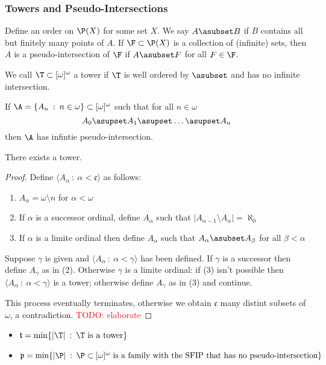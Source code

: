 \documentclass{article}
\begin{document}
\subsubsection{Towers and Pseudo-Intersections}
\begin{defn}
    Define an order on \(\P(X)\) for some set \(X\). We say \(A \asubset B\) if \(B\) contains all but finitely many points of \(A\). If \(\F \subset \P(X)\) is a collection of (infinite) sets, then \(A\) is a pseudo-intersection of \(\F\) if \(A \asubset F\) for all \(F \in \F\).
\end{defn}
\begin{defn}
    We call \(\T \subset [\omega]^{\omega}\) a tower if \(\T\) is well ordered by \(\asubset\) and has no infinite intersection.
\end{defn}
\begin{lem}
    If \(\A = \{A_n \: : \: n \in \omega\} \subset [\omega]^{\omega}\) such that for all \(n \in \omega\)
    \[
        A_0 \asupset  A_1 \asupset \dots \asupset  A_n
    \]
    then \(\A\) has infintie pseudo-intersection.
\end{lem}
\begin{thm}
    There exists a tower.
\end{thm}
\begin{proof}
    Define \(\langle A_{\alpha} \: : \: \alpha < \mathfrak{c}\rangle\) as follows: 
    \begin{enumerate}
        \item \(A_{\alpha} = \omega \setminus n\) for \(\alpha < \omega\)
        \item If \(\alpha\) is a successor ordinal, define \(A_{\alpha}\) such that \(|A_{\alpha - 1}\setminus A_{\alpha}| =\aleph_0\)
        \item If \(\alpha\) is a limite ordinal then define \(A_{\alpha}\) such that \(A_{\alpha} \asubset A_{\beta}\) for all \(\beta < \alpha\)
    \end{enumerate}
    Suppose \(\gamma\) is given and \(\langle A_{\alpha} \: : \: \alpha < \gamma \rangle\) has been defined. If \(\gamma\) is a successor then define \(A_{\gamma}\) as in (2). Otherwise \(\gamma\) is a limite ordinal: if (3) isn't possible then \(\langle A_{\alpha} \: : \: \alpha < \gamma \rangle\) is a tower; otherwise define \(A_{\gamma}\) as in (3) and continue. 

    This process eventually terminates, otherwise we obtain \(\mathfrak{c}\) many distint subsets of \(\omega\), a contradiction. \textcolor{red}{TODO: elaborate}
\end{proof}
\begin{defn}
    \leavevmode
    \begin{itemize}
        \item \(\mathfrak{t} = \min\{|\T| \: : \: \T \text{ is a tower}\}\)
        \item \(\mathfrak{p} = \min\{|\P| \: : \: \P \subset [\omega]^\omega\text{ is a family with the SFIP that has no pseudo-intersection}\}\)
    \end{itemize}
\end{defn}
\end{document}
